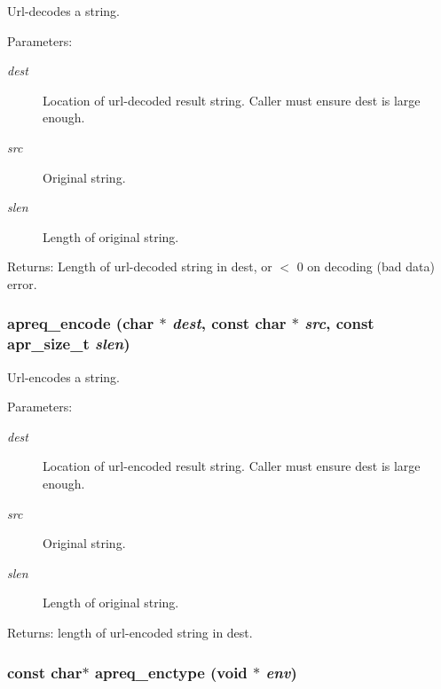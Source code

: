 Url-decodes a string. \begin{Desc}
\item[Parameters:]
\begin{description}
\item[{\em dest}]Location of url-decoded result string. Caller must ensure dest is large enough. \item[{\em src}]Original string. \item[{\em slen}]Length of original string. \end{description}
\end{Desc}
\begin{Desc}
\item[Returns:]Length of url-decoded string in dest, or $<$ 0 on decoding (bad data) error. \end{Desc}
\subsubsection{ apreq\_\-encode (char $\ast$ {\em dest}, const char $\ast$ {\em src}, const {\bf apr\_\-size\_\-t} {\em slen})}\label{group__Utils_a11}


Url-encodes a string. \begin{Desc}
\item[Parameters:]
\begin{description}
\item[{\em dest}]Location of url-encoded result string. Caller must ensure dest is large enough. \item[{\em src}]Original string. \item[{\em slen}]Length of original string. \end{description}
\end{Desc}
\begin{Desc}
\item[Returns:]length of url-encoded string in dest. \end{Desc}
\subsubsection{\setlength{\rightskip}{0pt plus 5cm}const char$\ast$ apreq\_\-enctype (void $\ast$ {\em env})}\label{group__Utils_a6}


